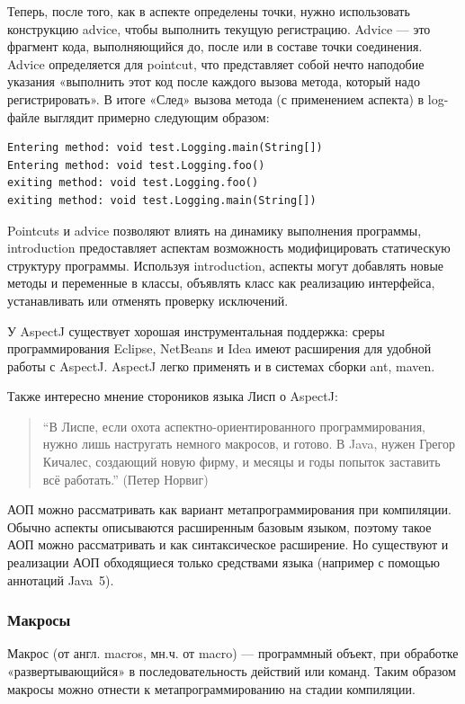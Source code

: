 \documentclass[a4paper,12pt,titlepage]{extarticle}
\begin{document}
Теперь, после того, как в аспекте определены точки, нужно использовать
конструкцию advice, чтобы выполнить текущую регистрацию. Advice — это фрагмент
кода, выполняющийся до, после или в составе точки соединения. Advice
определяется для pointcut, что представляет собой нечто наподобие указания
«выполнить этот код после каждого вызова метода, который надо регистрировать».
В итоге «След» вызова метода (с применением аспекта) в log-файле выглядит
примерно следующим образом:
\begin{verbatim}
Entering method: void test.Logging.main(String[])
Entering method: void test.Logging.foo()
exiting method: void test.Logging.foo()
exiting method: void test.Logging.main(String[]) 
\end{verbatim}

Pointcuts и advice позволяют влиять на динамику выполнения программы,
introduction предоставляет аспектам возможность модифицировать статическую
структуру программы. Используя introduction, аспекты могут добавлять новые
методы и переменные в классы, объявлять класс как реализацию интерфейса,
устанавливать или отменять проверку исключений.

У AspectJ существует хорошая инструментальная поддержка: среры программирования
Eclipse, NetBeans и Idea имеют расширения для удобной работы с AspectJ. AspectJ
легко применять и в системах сборки ant, maven.

Также интересно мнение стороников языка Лисп о AspectJ:
\begin{quote}
``В Лиспе, если охота аспектно-ориентированного программирования, нужно лишь
настругать немного макросов, и готово. В Java, нужен Грегор Кичалес, создающий
новую фирму, и месяцы и годы попыток заставить всё работать.'' (Петер Норвиг)
\end{quote}

АОП можно рассматривать как вариант метапрограммирования при компиляции.
Обычно аспекты описываются расширенным базовым языком, поэтому такое АОП можно
рассматривать и как синтаксическое расширение. Но существуют и реализации АОП
обходящиеся только средствами языка (например с помощью аннотаций Java~5).

\subsubsection*{Макросы}
 Макрос (от англ. macros, мн.ч. от macro) — программный объект, при обработке
«развертывающийся» в последовательность действий или команд. Таким образом
макросы можно отнести к метапрограммированию на стадии компиляции.
\end{document}
